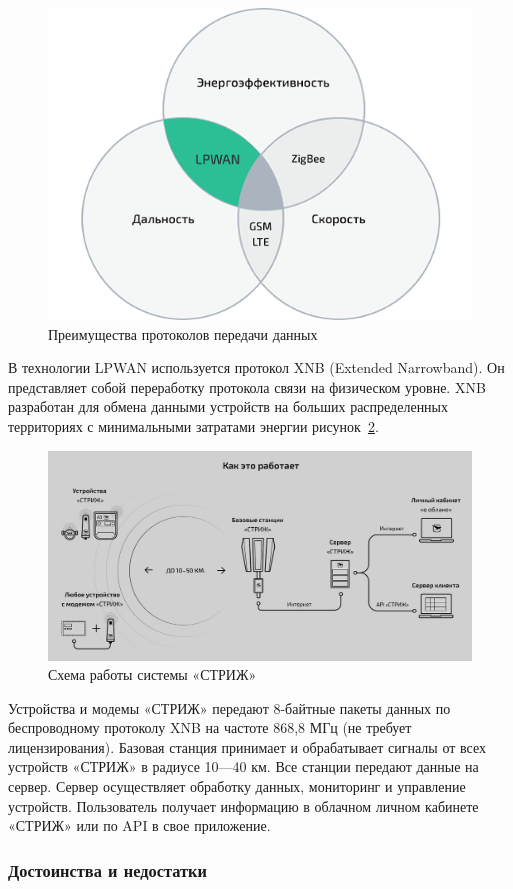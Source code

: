 \begin{figure}[H]
	\centering
	\includegraphics[width=0.7\linewidth]{pics/lpwan}
	\caption{Преимущества протоколов передачи данных}
	\label{fig:lpwan}
\end{figure}

В технологии LPWAN используется протокол XNB (Extended Narrowband). Он представляет собой переработку протокола связи на физическом уровне. XNB разработан для обмена данными устройств на больших распределенных территориях с минимальными затратами энергии рисунок~\ref{fig:strij}.

\begin{figure}[H]
	\centering
	\includegraphics[width=0.7\linewidth]{pics/strij}
	\caption{Схема работы системы «СТРИЖ»}
	\label{fig:strij}
\end{figure}

Устройства и модемы «СТРИЖ» передают 8-байтные пакеты данных по беспроводному протоколу XNB на частоте 868,8 МГц (не требует лицензирования). Базовая станция принимает и обрабатывает сигналы от всех устройств «СТРИЖ» в радиусе 10—40 км.  Все станции передают данные на сервер. Сервер осуществляет обработку данных, мониторинг и управление устройств. Пользователь получает информацию в облачном личном кабинете «СТРИЖ» или по API в свое приложение.

\subsubsection{Достоинства и недостатки}

